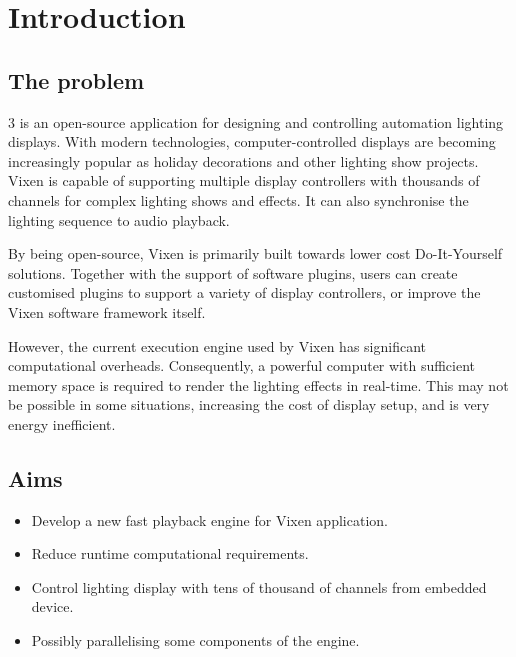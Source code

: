 \chapter{Introduction}
\renewcommand{\baselinestretch}{\mystretch}
\label{chap:Intro}

\section{The problem}

 3 \cite{vixen} is an open-source application for designing and controlling automation lighting displays. With modern technologies, computer-controlled displays are becoming increasingly popular as holiday decorations and other lighting show projects. Vixen is capable of supporting multiple display controllers with thousands of channels for complex lighting shows and effects. It can also synchronise the lighting sequence to audio playback.

By being open-source, Vixen is primarily built towards lower cost Do-It-Yourself solutions. Together with the support of software plugins, users can create customised plugins to support a variety of display controllers, or improve the Vixen software framework itself.

However, the current execution engine used by Vixen has significant computational overheads. Consequently, a powerful computer with sufficient memory space is required to render the lighting effects in real-time. This may not be possible in some situations, increasing the cost of display setup, and is very energy inefficient.

\clearpage

\section{Aims}


\begin{itemize}[noitemsep]
  \item Develop a new fast playback engine for Vixen application.
  \item Reduce runtime computational requirements.
  \item Control lighting display with tens of thousand of channels from embedded device.
  \item Possibly parallelising some components of the engine.
\end{itemize}

